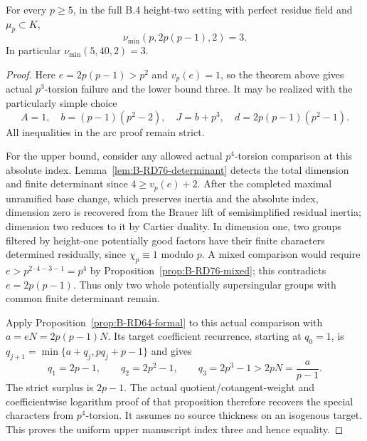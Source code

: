 \begin{theorem}
\label{thm:B-RD100-exact}
For every $p\ge5$, in the full B.4 height-two setting
with perfect residue field and $\mu_p\subset K$,
\[
                \nu_{\min}(p,2p(p-1),2)=3.              \tag{B-RD100.13}
\]
In particular $\nu_{\min}(5,40,2)=3$.
\end{theorem}
\begin{proof}
Here $e=2p(p-1)>p^2$ and $v_p(e)=1$, so the theorem
above gives actual $p^3$-torsion failure and the lower bound
three. It may be realized with the particularly simple
choice
\[
 A=1,\quad b=(p-1)(p^2-2),\quad
 J=b+p^3,\quad d=2p(p-1)(p^2-1).                      \tag{B-RD100.14}
\]
All inequalities in the arc proof remain strict.

For the upper bound, consider any allowed actual
$p^4$-torsion comparison at this absolute index.
Lemma~\ref{lem:B-RD76-determinant} detects the total
dimension and finite determinant since $4\ge v_p(e)+2$.
After the completed maximal unramified base change,
which preserves inertia and the absolute index, dimension
zero is recovered from the Brauer lift of semisimplified
residual inertia; dimension two reduces to it by Cartier
duality. In dimension one, two groups filtered by
height-one potentially good factors have their finite
characters determined residually, since $\chi_p\equiv1$
modulo $p$. A mixed comparison would require
$e>p^{2\cdot4-3-1}=p^4$ by
Proposition~\ref{prop:B-RD76-mixed}; this contradicts
$e=2p(p-1)$. Thus only two whole potentially
supersingular groups with common finite determinant remain.

Apply Proposition~\ref{prop:B-RD64-formal} to this actual
comparison with $a=eN=2p(p-1)N$. Its target coefficient
recurrence, starting at $q_0=1$, is
$q_{j+1}=\min\{a+q_j,pq_j+p-1\}$ and gives
\[
 q_1=2p-1,\qquad q_2=2p^2-1,\qquad
 q_3=2p^3-1>2pN=\frac a{p-1}.                       \tag{B-RD100.15}
\]
The strict surplus is $2p-1$.
The actual quotient/cotangent-weight and coefficientwise
logarithm proof of that proposition therefore recovers the
special characters from $p^4$-torsion. It assumes no
source thickness on an isogenous target. This proves
the uniform upper manuscript index three and hence equality.
\end{proof}

